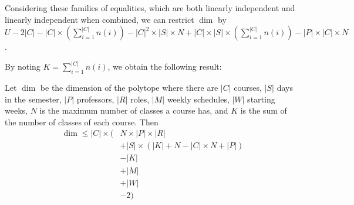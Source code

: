 Considering these families of equalities, which are both linearly independent and linearly independent when combined, we can restrict $\dim$ by $U - 2|C| - |C| \times (\sum_{i = 1}^{|C|} n(i)) - |C|^2 \times |S| \times N + |C| \times |S| \times (\sum_{i = 1}^{|C|} n(i)) - |P| \times |C| \times N$.

By noting $K = \sum_{i=1}^{|C|} n(i)$, we obtain the following result:

\begin{thm}
Let $\dim$ be the dimension of the polytope where there are $|C|$ courses, $|S|$ days in the semester, $|P|$ professors, $|R|$ roles, $|M|$ weekly schedules, $|W|$ starting weeks, $N$ is the maximum number of classes a course has, and $K$ is the sum of the number of classes of each course. Then
\begin{align*}
  \dim \le |C| \times (&N \times |P| \times |R|
                       \\&+ |S| \times (|K| + N - |C| \times N + |P|)
                       \\&- |K|
                       \\&+ |M|
                       \\&+ |W|
                       \\&- 2) 
\end{align*}
\end{thm}

